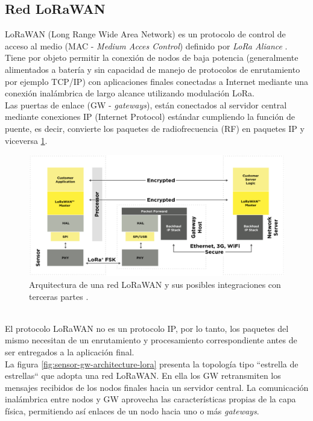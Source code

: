 \subsection{Red LoRaWAN}
LoRaWAN (Long Range Wide Area Network) es un protocolo de control de acceso al medio (MAC - \textit{Medium Acces Control}) definido por \textit{LoRa Aliance} \citep{lora_alliance}. Tiene por objeto permitir la conexión de nodos de baja potencia (generalmente alimentados a batería y sin capacidad de manejo de protocolos de enrutamiento por ejemplo TCP/IP) con aplicaciones finales conectadas a Internet mediante una conexión inalámbrica de largo alcance utilizando modulación LoRa.\\
Las puertas de enlace (GW - \textit{gateways}), están conectados al servidor central mediante conexiones IP (Internet Protocol) estándar cumpliendo la función de puente, es decir, convierte los paquetes de radiofrecuencia (RF) en paquetes IP y viceversa \ref{fig:arqlorawan}.\\
\begin{figure}[h]
	\centering
	\includegraphics[width=0.9\linewidth]{Figures/arq_lorawan_2}
	\caption{Arquitectura de una red LoRaWAN y sus posibles integraciones con terceras partes \citep{lora_alliance}.}
	\label{fig:arqlorawan}
\end{figure}\\
El protocolo LoRaWAN no es un protocolo IP, por lo tanto, los paquetes del mismo necesitan de un enrutamiento y procesamiento correspondiente antes de ser entregados a la aplicación final.\\
La figura \ref{fig:sensor-gw-architecture-lora} presenta la topología tipo ``estrella de estrellas`` que adopta una red LoRaWAN. En ella los GW retransmiten los mensajes recibidos de los nodos finales hacia un servidor central. La comunicación inalámbrica entre nodos y GW aprovecha las características propias de la capa física, permitiendo así enlaces de un nodo hacia uno o más \textit{gateways}.\\
